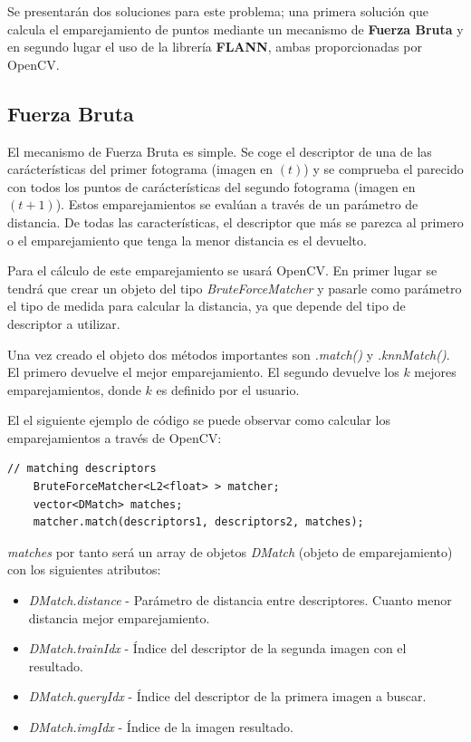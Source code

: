 Se presentarán dos soluciones para este problema; una primera solución que calcula el emparejamiento de puntos mediante un mecanismo de \textbf{Fuerza Bruta} y en segundo lugar el uso de la librería \textbf{FLANN}, ambas proporcionadas por OpenCV.

\subsection{Fuerza Bruta}

El mecanismo de Fuerza Bruta es simple. Se coge el descriptor de una de las carácterísticas del primer fotograma (imagen en $(t)$) y se comprueba el parecido con todos los puntos de carácterísticas del segundo fotograma (imagen en $(t+1)$). Estos emparejamientos se evalúan a través de un parámetro de distancia. De todas las características, el descriptor que más se parezca al primero o el emparejamiento que tenga la menor distancia es el devuelto.

Para el cálculo de este emparejamiento se usará OpenCV. En primer lugar se tendrá que crear un objeto del tipo \textit{BruteForceMatcher} y pasarle como parámetro el tipo de medida para calcular la distancia, ya que depende del tipo de descriptor a utilizar.

Una vez creado el objeto dos métodos importantes son \textit{.match()} y \textit{.knnMatch()}. El primero devuelve el mejor emparejamiento. El segundo devuelve los $k$ mejores emparejamientos, donde $k$ es definido por el usuario.


El el siguiente ejemplo de código se puede observar como calcular los emparejamientos a través de OpenCV:

\begin{lstlisting}[style=CStyle]
	// matching descriptors
	BruteForceMatcher<L2<float> > matcher;
	vector<DMatch> matches;
	matcher.match(descriptors1, descriptors2, matches);
\end{lstlisting}

\textit{matches} por tanto será un array de objetos \textit{DMatch} (objeto de emparejamiento) con los siguientes atributos:

\begin{itemize}
\item \textit{DMatch.distance} - Parámetro de distancia entre descriptores. Cuanto menor distancia mejor emparejamiento.

\item \textit{DMatch.trainIdx} - Índice del descriptor de la segunda imagen con el resultado.

\item \textit{DMatch.queryIdx} - Índice del descriptor de la primera imagen a buscar.

\item \textit{DMatch.imgIdx} - Índice de la imagen resultado.
\end{itemize}

